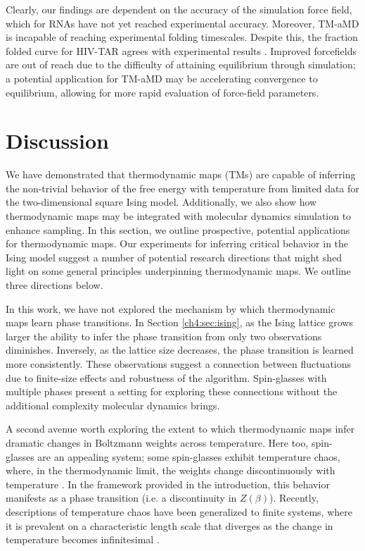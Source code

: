 Clearly, our findings are dependent on the accuracy of the simulation force field, which for RNAs have not yet reached experimental accuracy. Moreover, TM-aMD is incapable of reaching experimental folding timescales. Despite this, the fraction folded curve for HIV-TAR agrees with experimental results \cite{hiv-experiment}. Improved forcefields are out of reach due to the difficulty of attaining equilibrium through simulation; a potential application for TM-aMD may be accelerating convergence to equilibrium, allowing for more rapid evaluation of force-field parameters.

\section{Discussion}

We have demonstrated that thermodynamic maps (TMs) are capable of inferring the non-trivial behavior of the free energy with temperature from limited data for the two-dimensional square Ising model. Additionally, we also show how thermodynamic maps may be integrated with molecular dynamics simulation to enhance sampling. In this section, we outline prospective, potential applications for thermodynamic maps. Our experiments for inferring critical behavior in the Ising model suggest a number of potential research directions that might shed light on some general principles underpinning thermodynamic maps. We outline three directions below.

In this work, we have not explored the mechanism by which thermodynamic maps learn phase transitions. In Section \ref{ch4:sec:ising}, as the Ising lattice grows larger the ability to infer the phase transition from only two observations diminishes. Inversely, as the lattice size decreases, the phase transition is learned more consistently. These observations suggest a connection between fluctuations due to finite-size effects and robustness of the algorithm. Spin-glasses with multiple phases present a setting for exploring these connections without the additional complexity molecular dynamics brings.

A second avenue worth exploring the extent to which thermodynamic maps infer dramatic changes in Boltzmann weights across temperature. Here too, spin-glasses are an appealing system; some spin-glasses exhibit temperature chaos, where, in the thermodynamic limit, the weights change discontinuously with temperature \cite{ritort-temperature-chaos}. In the framework provided in the introduction, this behavior manifests as a phase transition (i.e. a discontinuity in $Z(\beta)$). Recently, descriptions of temperature chaos have been generalized to finite systems, where it is prevalent on a characteristic length scale that diverges as the change in temperature becomes infinitesimal \cite{parisi-temperature-chaos}.


